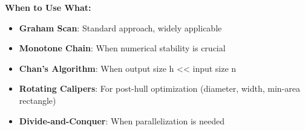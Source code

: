 \begin{summarycard}
\textbf{When to Use What:}
\begin{itemize}
    \item \textbf{Graham Scan}: Standard approach, widely applicable
    \item \textbf{Monotone Chain}: When numerical stability is crucial
    \item \textbf{Chan's Algorithm}: When output size h << input size n
    \item \textbf{Rotating Calipers}: For post-hull optimization (diameter, width, min-area rectangle)
    \item \textbf{Divide-and-Conquer}: When parallelization is needed
\end{itemize}
\end{summarycard}
